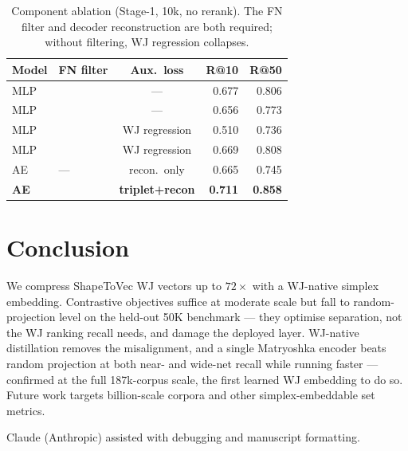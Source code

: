 \documentclass[sigconf]{acmart}
\newcommand{\cmark}{\ding{51}}\newcommand{\xmark}{\ding{55}}
\begin{document}
\begin{table}[t]\centering
\caption{Component ablation (Stage-1, 10k, no rerank). The FN filter and decoder
reconstruction are both required; without filtering, WJ regression collapses.}
\label{tab:ablation}\small\setlength{\tabcolsep}{4pt}
\begin{tabular}{@{}llcrr@{}}
\toprule
Model & FN filter & Aux.\ loss & R@10 & R@50 \\
\midrule
MLP & \xmark & ---           & 0.677 & 0.806 \\
MLP & \cmark & ---           & 0.656 & 0.773 \\
MLP & \xmark & WJ regression & 0.510 & 0.736 \\
MLP & \cmark & WJ regression & 0.669 & 0.808 \\
AE  & ---    & recon.\ only  & 0.665 & 0.745 \\
\textbf{AE} & \cmark & \textbf{triplet+recon} & \textbf{0.711} & \textbf{0.858} \\
\bottomrule
\end{tabular}
\end{table}

\section{Conclusion}
We compress ShapeToVec WJ vectors up to $72\times$ with a WJ-native simplex
embedding. Contrastive objectives suffice at moderate scale but fall to
random-projection level on the held-out 50K benchmark --- they optimise separation,
not the WJ ranking recall needs, and damage the deployed layer. WJ-native
distillation removes the misalignment, and a single Matryoshka encoder beats random
projection at both near- and wide-net recall while running faster --- confirmed at
the full 187k-corpus scale, the first learned WJ embedding to do so. Future work
targets billion-scale corpora and other simplex-embeddable set metrics.

\begin{acks}
Claude (Anthropic) assisted with debugging and manuscript formatting.
\end{acks}



\end{document}
